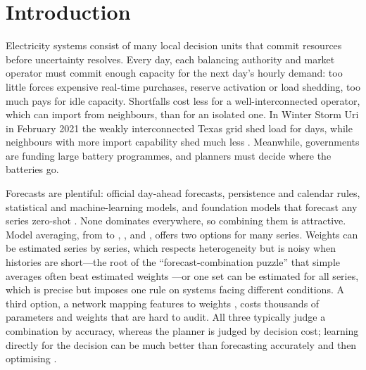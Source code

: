 \section{Introduction}\label{sec:intro}

Electricity systems consist of many local decision units that commit resources before uncertainty resolves.
Every day, each balancing authority and market operator must commit enough capacity for the next day's hourly demand: too little forces expensive real-time purchases, reserve activation or load shedding, too much pays for idle capacity.
Shortfalls cost less for a well-interconnected operator, which can import from neighbours, than for an isolated one.
In Winter Storm Uri in February 2021 the weakly interconnected Texas grid shed load for days, while neighbours with more import capability shed much less \citep{Busby2021,FERCNERC2021}.
Meanwhile, governments are funding large battery programmes, and planners must decide where the batteries go.

Forecasts are plentiful: official day-ahead forecasts, persistence and calendar rules, statistical and machine-learning models, and foundation models that forecast any series zero-shot \citep{Ansari2024chronos}.
None dominates everywhere, so combining them is attractive.
Model averaging, from \citet{BatesGranger1969} to \citet{Hansen2007}, \citet{HansenRacine2012}, \citet{ZhangWanZou2013} and \citet{ZhangLiu2023}, offers two options for many series.
Weights can be estimated series by series, which respects heterogeneity but is noisy when histories are short---the root of the ``forecast-combination puzzle'' that simple averages often beat estimated weights \citep{SmithWallis2009,Claeskens2016}---or one set can be estimated for all series, which is precise but imposes one rule on systems facing different conditions.
A third option, a network mapping features to weights \citep{MonteroManso2020,Gong2026moe}, costs thousands of parameters and weights that are hard to audit.
All three typically judge a combination by accuracy, whereas the planner is judged by decision cost; learning directly for the decision can be much better than forecasting accurately and then optimising \citep{BanRudin2019,BertsimasKallus2020,ElmachtoubGrigas2022}.

